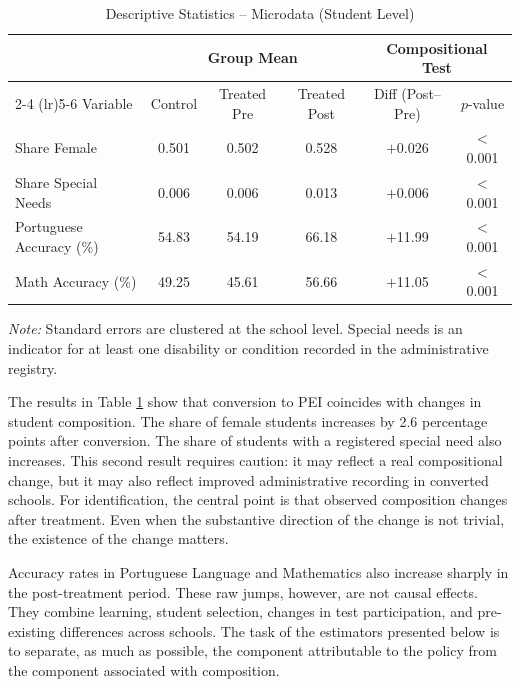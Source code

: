 \begin{table}[htbp]
\centering
\caption{Descriptive Statistics -- Microdata (Student Level)}
\label{tab:micro}
\small
\begin{threeparttable}
\begin{tabular}{lccccc}
\toprule
 & \multicolumn{3}{c}{Group Mean} & \multicolumn{2}{c}{Compositional Test} \\
\cmidrule(lr){2-4} \cmidrule(lr){5-6}
Variable & Control & Treated Pre & Treated Post & Diff (Post--Pre) & $p$-value \\
\midrule
Share Female              & 0.501 & 0.502 & 0.528 & $+$0.026 & $<$0.001 \\
Share Special Needs       & 0.006 & 0.006 & 0.013 & $+$0.006 & $<$0.001 \\
Portuguese Accuracy (\%)  & 54.83 & 54.19 & 66.18 & $+$11.99 & $<$0.001 \\
Math Accuracy (\%)        & 49.25 & 45.61 & 56.66 & $+$11.05 & $<$0.001 \\
\bottomrule
\end{tabular}
\begin{tablenotes}
\footnotesize
\item \textit{Note:} Standard errors are clustered at the school level. Special needs is an indicator for at least one disability or condition recorded in the administrative registry.
\end{tablenotes}
\end{threeparttable}
\end{table}

The results in Table \ref{tab:micro} show that conversion to PEI coincides with changes in student composition. The share of female students increases by 2.6 percentage points after conversion. The share of students with a registered special need also increases. This second result requires caution: it may reflect a real compositional change, but it may also reflect improved administrative recording in converted schools. For identification, the central point is that observed composition changes after treatment. Even when the substantive direction of the change is not trivial, the existence of the change matters.

Accuracy rates in Portuguese Language and Mathematics also increase sharply in the post-treatment period. These raw jumps, however, are not causal effects. They combine learning, student selection, changes in test participation, and pre-existing differences across schools. The task of the estimators presented below is to separate, as much as possible, the component attributable to the policy from the component associated with composition.

